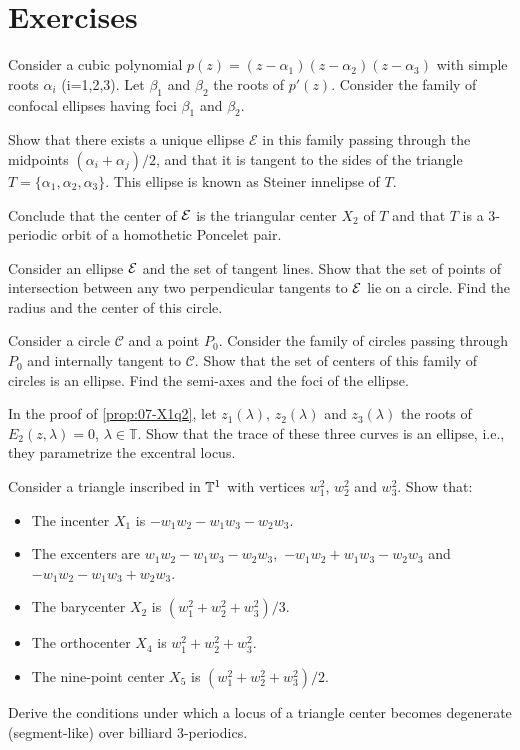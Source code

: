 \section{Exercises}
\label{sec:07-exercises}

\begin{exercise}
Consider a cubic polynomial $p(z)=(z-\alpha_1)(z-\alpha_2)(z-\alpha_3)$ with simple roots $\alpha_i$ (i=1,2,3).
Let $\beta_1$ and $\beta_2$ the roots of $p'(z)$.
Consider the family of confocal ellipses having foci $\beta_1$ and $\beta_2$.

Show that there exists a unique ellipse $\mathcal E$ in this family passing through the midpoints $(\alpha_i+\alpha_j)/2$, and that it is tangent to the sides of the triangle $T=\{\alpha_1,\alpha_2,\alpha_3\}$. This ellipse is known as Steiner innelipse of $T$.

Conclude that the center of $\mathcal{E}$ is the triangular center  $X_2$ of $T$ and that $T$ is a 3-periodic orbit of a homothetic Poncelet pair.
\end{exercise}

\begin{exercise} Consider an ellipse $\mathcal{E}$ and the set of tangent lines. Show that the set of points of intersection between any two perpendicular
tangents to $\mathcal{E}$  lie on a circle. Find the radius and the center of this circle.
\end{exercise}

\begin{exercise}
Consider a circle $\mathcal{C}$ and a point $P_0$.   Consider the family of circles passing through $P_0$ and internally tangent to $\mathcal{C}$. Show that the set of centers of this family of circles is an ellipse.
Find the semi-axes and the foci of the ellipse.
\end{exercise}

\begin{exercise}
In the proof of \cref{prop:07-X1q2}, let $z_1(\lambda)$, $ z_2(\lambda) $ and $z_3(\lambda)$ the roots of   $E_2(z,\lambda)=0$, $\lambda \in \mathbb{T}$. Show that  the trace of these three curves is an ellipse, i.e., they parametrize the excentral locus.   
\end{exercise}

\begin{exercise}
Consider a triangle inscribed in $\mathbb{T}^1$ with vertices $w_1^2$, $w_2^2$ and $w_3^2$. Show that:
\begin{itemize}
\item The incenter $X_1$ is $-w_1w_2-w_1w_3-w_2w_3$.
\item  The excenters are 
$w_1w_2-w_1w_3-w_2w_3$,\, $-w_1w_2+w_1w_3-w_2w_3$ and $-w_1w_2-w_1w_3+w_2w_3$.
\item The barycenter  $X_2$ is
$(w_1^2+w_2^2+w_3^2)/3$.
\item The orthocenter $X_4$ is
$w_1^2+w_2^2+w_3^2$.
\item The nine-point center $X_5$   is $(w_1^2+w_2^2+w_3^2)/2$.
\end{itemize}
\label{exe:05-X1}
\end{exercise}

\begin{exercise}
Derive the conditions under which a locus of a triangle center becomes degenerate (segment-like) over billiard 3-periodics.
\end{exercise}